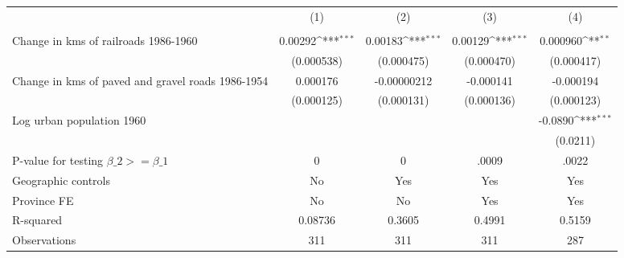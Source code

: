 {
\def\sym#1{\ifmmode^{#1}\else\(^{#1}\)\fi}
\begin{tabular}{l*{4}{c}}
\hline\hline
                &\multicolumn{1}{c}{(1)}&\multicolumn{1}{c}{(2)}&\multicolumn{1}{c}{(3)}&\multicolumn{1}{c}{(4)}\\
                &\multicolumn{1}{c}{}&\multicolumn{1}{c}{}&\multicolumn{1}{c}{}&\multicolumn{1}{c}{}\\
\hline
Change in kms of railroads 1986-1960&  0.00292\sym{***}&  0.00183\sym{***}&  0.00129\sym{***}& 0.000960\sym{**} \\
                &(0.000538)         &(0.000475)         &(0.000470)         &(0.000417)         \\
[1em]
Change in kms of paved and gravel roads 1986-1954& 0.000176         &-0.00000212         &-0.000141         &-0.000194         \\
                &(0.000125)         &(0.000131)         &(0.000136)         &(0.000123)         \\
[1em]
Log urban population 1960&                  &                  &                  &  -0.0890\sym{***}\\
                &                  &                  &                  & (0.0211)         \\
\hline
P-value for testing $\beta\_{2} >= \beta\_{1}$&        0         &        0         &    .0009         &    .0022         \\
Geographic controls&       No         &      Yes         &      Yes         &      Yes         \\
Province FE     &       No         &       No         &      Yes         &      Yes         \\
R-squared       &  0.08736         &   0.3605         &   0.4991         &   0.5159         \\
Observations    &      311         &      311         &      311         &      287         \\
\hline\hline
\end{tabular}
}
